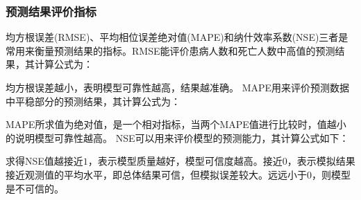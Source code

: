 \documentclass{whutmod}
\begin{document}
	   \subsubsection{预测结果评价指标}
	   均方根误差(RMSE)、平均相位误差绝对值(MAPE)和纳什效率系数(NSE)三者是常用来衡量预测结果的指标。RMSE能评价患病人数和死亡人数中高值的预测结果，其计算公式为：
	   
	   均方根误差越小，表明模型可靠性越高，结果越准确。
	     MAPE用来评价预测数据中平稳部分的预测结果，其计算公式为：
	     
	     MAPE所求值为绝对值，是一个相对指标，当两个MAPE值进行比较时，值越小的说明模型可靠性越高。
	       NSE可以用来评价模型的预测能力，其计算公式如下：
	       
	       求得NSE值越接近$1$，表示模型质量越好，模型可信度越高。接近$0$，表示模拟结果接近观测值的平均水平，即总体结果可信，但模拟误差较大。远远小于$0$，则模型是不可信的。
	   
	   
	   
\end{document}
